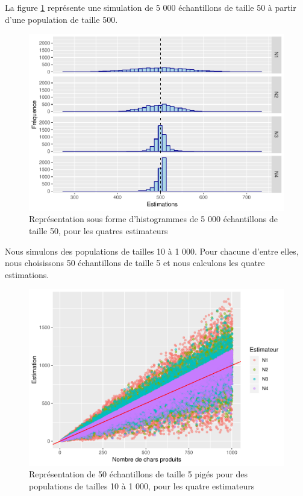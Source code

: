 \documentclass[10pt]{article}
\begin{document}
La figure \ref{fig:ech-taille-50} représente une simulation de 5 000
échantillons de taille 50 à partir d'une population de taille 500.

\begin{figure}

{\centering \includegraphics[width=0.9\linewidth]{serial_number_amq_files/figure-latex/ech-taille-50-1} 

}

\caption{Représentation sous forme d'histogrammes de 5 000 échantillons de taille 50, pour les quatres estimateurs}\label{fig:ech-taille-50}
\end{figure}

Nous simulons des populations de tailles 10 à 1 000. Pour chacune
d'entre elles, nous choisissons 50 échantillons de taille 5 et nous
calculons les quatre estimations.

\begin{figure}

{\centering \includegraphics[width=0.9\linewidth]{serial_number_amq_files/figure-latex/ech-10-1000-1} 

}

\caption{Représentation de 50 échantillons de taille 5 pigés pour des populations de tailles 10 à 1 000, pour les quatre estimateurs}\label{fig:ech-10-1000}
\end{figure}
\end{document}
